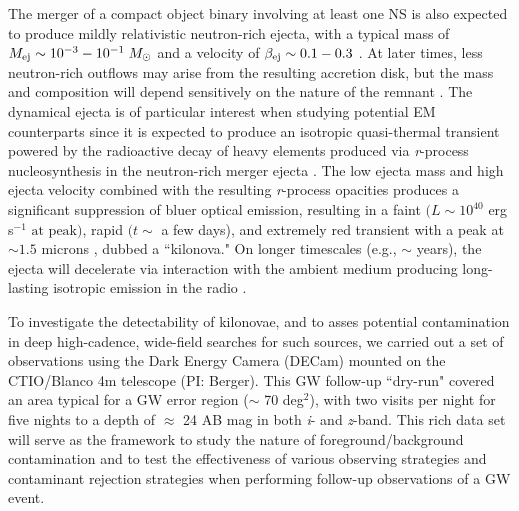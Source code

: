 The merger of a compact object binary involving at least one NS is also expected to produce mildly relativistic neutron-rich ejecta, with a typical mass of $M_{{\rm ej}} \sim 10^{-3}-10^{-1}\; M_{\odot}$ and a velocity of $\beta_{{\rm ej}} \sim 0.1-0.3$ \citep[see e.g.,][]{Rosswog+99,Rosswog05,Bauswein+13a}. At later times, less neutron-rich outflows may arise from the resulting accretion disk, but the mass and composition will depend sensitively on the nature of the remnant \citep[see e.g.,][]{Metzger+09a,Dessart+09,FernandezMetzger13,Fernandez+14}. The dynamical ejecta is of particular interest when studying potential EM counterparts since it is expected to produce an isotropic quasi-thermal transient powered by the radioactive decay of heavy elements produced via {\em r}-process nucleosynthesis in the neutron-rich merger ejecta \citep{LP98,Rosswog05,Metzger+10,Grossman+14,Tanaka+14}. The low ejecta mass and high ejecta velocity combined with the resulting {\em r}-process opacities \citep[$\kappa \sim 10-100 \; \text{cm}^2 \text{ g}^{-1} \text{ for } \lambda \sim 0.3 - 3\; \mu\text{m}$,][]{Kasen+13} produces a significant suppression of bluer optical emission, resulting in a faint $(L \sim 10^{40}$ erg s$^{-1} \text{ at peak})$, rapid $(t \sim$ a few days), and extremely red transient with a peak at $\sim1.5$ microns \citep[see e.g.,][]{Kasen+13,BarnesKasen13,TanakaHotokezaka13}, dubbed a ``kilonova." On longer timescales (e.g., $\sim$ years), the ejecta will decelerate via interaction with the ambient medium producing long-lasting isotropic emission in the radio \citep{NakarPiran2011}.

To investigate the detectability of kilonovae, and to asses potential contamination in deep high-cadence, wide-field searches for such sources, we carried out a set of observations using the Dark Energy Camera (DECam) mounted on the CTIO/Blanco 4m telescope (PI: Berger). This GW follow-up ``dry-run" covered an area typical for a GW error region ($\sim$ 70 deg$^2$), with two visits per night for five nights to a depth of $\approx$ 24 AB mag in both {\em i}- and {\em z}-band. This rich data set will serve as the framework to study the nature of foreground/background contamination and to test the effectiveness of various observing strategies and contaminant rejection strategies when performing follow-up observations of a GW event.

